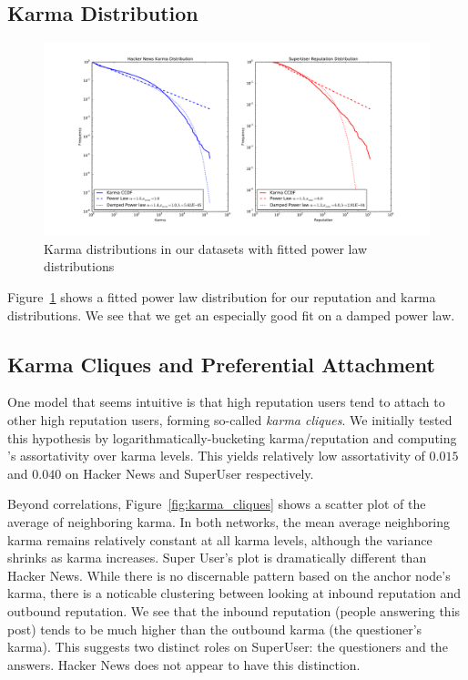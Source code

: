 \documentclass[11pt]{article}
\begin{document}
\subsection{Karma Distribution}
\begin{figure}[t]
\centering
\includegraphics[width=0.95\linewidth]{powerlaws}
\caption{Karma distributions in our datasets with fitted power law distributions}
\label{fig:powerlaws}
\end{figure}

Figure~\ref{fig:powerlaws} shows a fitted power law distribution for our
reputation and karma distributions. We see that we get an especially good fit on
a damped power law.

\subsection{Karma Cliques and Preferential Attachment}
\label{sec:karma_cliques}
One model that seems intuitive is that high reputation users
tend to attach to other high reputation users, forming so-called
\textit{karma cliques}. We initially tested this hypothesis by
logarithmatically-bucketing karma/reputation and computing 
\citet{newman2003mixing}'s assortativity over karma levels. This yields
relatively low assortativity of $0.015$ and $0.040$ on Hacker News
and SuperUser respectively. 

Beyond correlations, Figure~\ref{fig:karma_cliques}
shows a scatter plot of the average of neighboring karma. In both networks,
the mean average neighboring karma remains relatively constant at all
karma levels, although the variance shrinks as karma increases.
Super User's plot is dramatically different than Hacker News. While there is
no discernable pattern based on the anchor node's karma, there is a noticable
clustering between looking at inbound reputation and outbound reputation. We see
that the inbound reputation (people answering this post) tends to be much higher
than the outbound karma (the questioner's karma). This suggests two distinct
roles on SuperUser: the questioners and the answers. Hacker News does not
appear to have this distinction.
\end{document}
